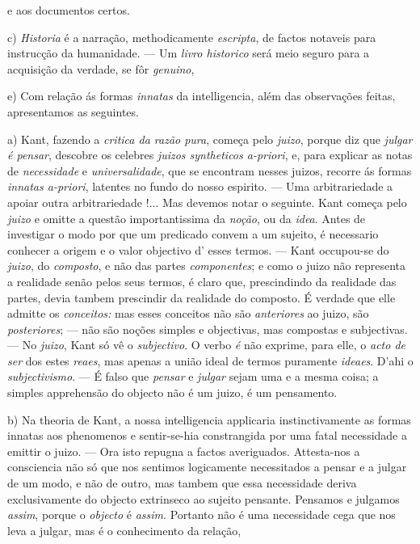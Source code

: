 e aos documentos certos.

c) \emph{Historia} é a narração, methodicamente \emph{escripta}, de factos notaveis para instrucção da humanidade. --- Um \emph{livro historico} será meio seguro para a acquisição da verdade, se fôr \emph{genuino},

e) Com relação ás formas \emph{innatas} da intelligencia, além das observações feitas, apresentamos as seguintes.

a) Kant, fazendo a \emph{critica da razão pura}, começa pelo \emph{juizo}, porque diz que \emph{julgar é pensar}, descobre os celebres \emph{juizos syntheticos a-priori}, e, para explicar as notas de \emph{necessidade} e \emph{universalidade}, que se encontram nesses juizos, recorre ás formas \emph{innatas a-priori}, latentes no fundo do nosso espirito. --- Uma arbitrariedade a apoiar outra arbitrariedade !... Mas devemos notar o seguinte. Kant começa pelo \emph{juizo} e omitte a questão importantissima da \emph{noção}, ou da \emph{idea}. Antes de investigar o modo por que um predicado convem a um sujeito, é necessario conhecer a origem e o valor objectivo d' esses termos. --- Kant occupou-se do \emph{juizo}, do \emph{composto}, e não das partes \emph{componentes}; e como o juizo não representa a realidade senão pelos seus termos, é claro que, prescindindo da realidade das partes, devia tambem prescindir da realidade do composto. É verdade que elle admitte os \emph{conceitos:} mas esses conceitos não são \emph{anteriores} ao juizo, são \emph{posteriores}; --- não são noções simples e objectivas, mas compostas e subjectivas. --- No \emph{juizo}, Kant só vê o \emph{subjectivo}. O verbo \emph{é} não exprime, para elle, o \emph{acto de ser} dos estes \emph{reaes}, mas apenas a união ideal de termos puramente \emph{ideaes}. D'ahi o \emph{subjectivismo}. --- É falso que \emph{pensar} e \emph{julgar} sejam uma e a mesma coisa; a simples apprehensão do objecto não é um juizo, é um pensamento.

b) Na theoria de Kant, a nossa intelligencia applicaria instinctivamente as formas innatas aos phenomenos e sentir-se-hia constrangida por uma fatal necessidade a emittir o juizo. --- Ora isto repugna a factos averiguados. Attesta-nos a consciencia não só que nos sentimos logicamente necessitados a pensar e a julgar de um modo, e não de outro, mas tambem que essa necessidade deriva exclusivamente do objecto extrinseco ao sujeito pensante. Pensamos e julgamos \emph{assim}, porque o \emph{objecto} é \emph{assim}. Portanto não é uma necessidade cega que nos leva a julgar, mas é o conhecimento da relação,

